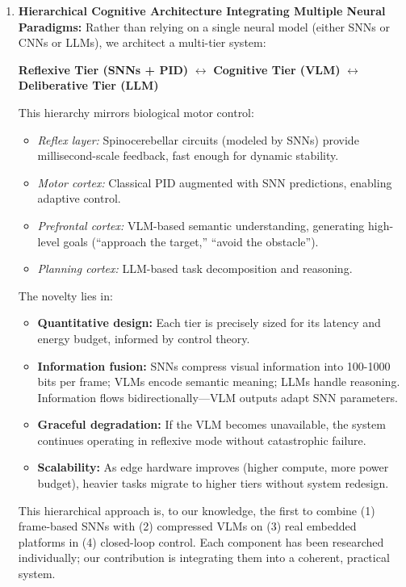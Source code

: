 \begin{enumerate}
This end-to-end validation is rare in the neuromorphic literature and provides critical ground truth for the 
practical viability of SNNs in robotics.

    
\item \textbf{Hierarchical Cognitive Architecture Integrating Multiple Neural Paradigms:}
Rather than relying on a single neural model (either SNNs or CNNs or LLMs), we architect a multi-tier system:

\begin{center}
\textbf{Reflexive Tier (SNNs + PID)} $\leftrightarrow$ \textbf{Cognitive Tier (VLM)} $\leftrightarrow$ 
\textbf{Deliberative Tier (LLM)}
\end{center}

This hierarchy mirrors biological motor control:
\begin{itemize}
    \item \textit{Reflex layer:} Spinocerebellar circuits (modeled by SNNs) provide millisecond-scale feedback, 
    fast enough for dynamic stability.
    
    \item \textit{Motor cortex:} Classical PID augmented with SNN predictions, enabling adaptive control.
    
    \item \textit{Prefrontal cortex:} VLM-based semantic understanding, generating high-level goals 
    (``approach the target,'' ``avoid the obstacle'').
    
    \item \textit{Planning cortex:} LLM-based task decomposition and reasoning.
\end{itemize}

The novelty lies in:
\begin{itemize}
    \item \textbf{Quantitative design:} Each tier is precisely sized for its latency and energy budget, 
    informed by control theory.
    
    \item \textbf{Information fusion:} SNNs compress visual information into 100-1000 bits per frame; VLMs 
    encode semantic meaning; LLMs handle reasoning. Information flows bidirectionally—VLM outputs adapt SNN 
    parameters.
    
    \item \textbf{Graceful degradation:} If the VLM becomes unavailable, the system continues operating in 
    reflexive mode without catastrophic failure.
    
    \item \textbf{Scalability:} As edge hardware improves (higher compute, more power budget), heavier tasks 
    migrate to higher tiers without system redesign.
\end{itemize}

This hierarchical approach is, to our knowledge, the first to combine (1) frame-based SNNs with (2) compressed 
VLMs on (3) real embedded platforms in (4) closed-loop control. Each component has been researched individually; 
our contribution is integrating them into a coherent, practical system.

\end{enumerate}

